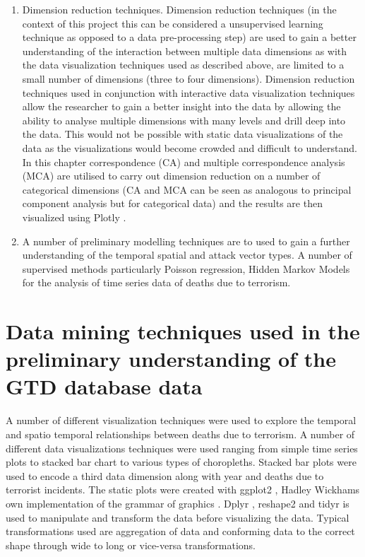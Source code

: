 \begin{enumerate}
\item Dimension reduction techniques. Dimension reduction techniques (in the context of this project this can be considered a unsupervised learning technique as opposed to a data pre-processing step) are used to gain a better understanding of the interaction between multiple data dimensions as with the data visualization techniques used as described above, are limited to a small number of dimensions (three to four dimensions). Dimension reduction techniques used in conjunction with interactive data visualization techniques  allow the researcher to gain a better insight into the data by allowing the ability to analyse multiple dimensions with many levels and drill deep into the data. This would not be possible with static data visualizations of the data as the visualizations would become crowded and difficult to understand. In this chapter correspondence (CA) and multiple correspondence analysis (MCA) \citep{factominer2008} are utilised to carry out dimension reduction on a number of categorical dimensions (CA and MCA can be seen as analogous to principal component analysis but for categorical data) and the results are then visualized using Plotly \citep{plotlymanual2016}. 
\item A number of preliminary modelling techniques are to used to gain a further understanding of the temporal spatial and attack vector types. A number of supervised methods particularly Poisson regression, Hidden Markov Models for the analysis of time series data of deaths due to terrorism. 
\end{enumerate}

\section{Data mining techniques used in the preliminary understanding of the GTD database data}
\label{sec:chap4dataprep}

A number of different visualization techniques were used to explore the temporal and spatio temporal relationships between deaths due to terrorism.  A number of different data visualizations techniques were used ranging from simple time series plots to stacked bar chart to various types of choropleths. Stacked bar plots were used to encode a third data dimension along with year and deaths due to terrorist incidents. The static plots were created with ggplot2 \citep{ggplotwickham2009}, Hadley Wickhams own implementation of the grammar of graphics \citep{wilkinson2006grammar}. Dplyr \citep{dplyr2016wickham}, reshape2 \citep{reshape2007wickham} and tidyr \citep{tidyr2916Wickham} is used to manipulate and transform the data before visualizing the data. Typical transformations used are aggregation of data and conforming data to the correct shape through wide to long or vice-versa transformations.

